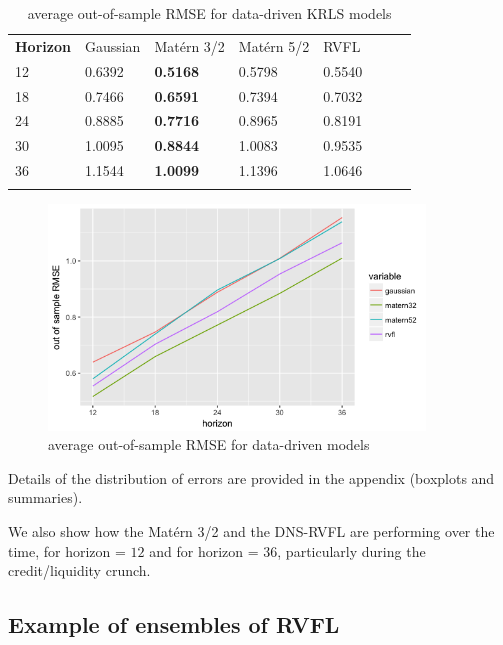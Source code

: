 \begin{table}[!htb]
\begin{center}
\caption{average out-of-sample RMSE for data-driven KRLS models}
\label{tab:min_value_no_ns}       %
\begin{tabular}{llllllll}
\hline\noalign{\smallskip}
\textbf{Horizon} & Gaussian & Mat\'ern 3/2  & Mat\'ern 5/2 & RVFL  \\
\noalign{\smallskip}\hline\noalign{\smallskip}
 12 & 0.6392 & \textbf{0.5168} & 0.5798 & 0.5540 \\
 18 & 0.7466 & \textbf{0.6591} & 0.7394 & 0.7032 \\
 24 & 0.8885 & \textbf{0.7716} & 0.8965 & 0.8191  \\
 30 & 1.0095 & \textbf{0.8844} & 1.0083 & 0.9535  \\
 36 & 1.1544 & \textbf{1.0099} & 1.1396 & 1.0646 \\
 \noalign{\smallskip}\hline
\end{tabular}
\end{center}
\end{table}

\newpage

\begin{figure}[!htb]
\centering
\includegraphics[width=10cm]{gfx/chapter-bayesianrvfl/oos_krls.png}
\caption{average out-of-sample RMSE for data-driven models}
\label{oos_krls}
\end{figure}

Details of the distribution of errors are provided in the appendix (boxplots and summaries). 

We also show how the Mat\'ern 3/2 and the DNS-RVFL are performing over the time, for horizon = $12$ and for horizon = $36$, particularly during the credit/liquidity crunch.



\subsection{Example of ensembles of RVFL}

